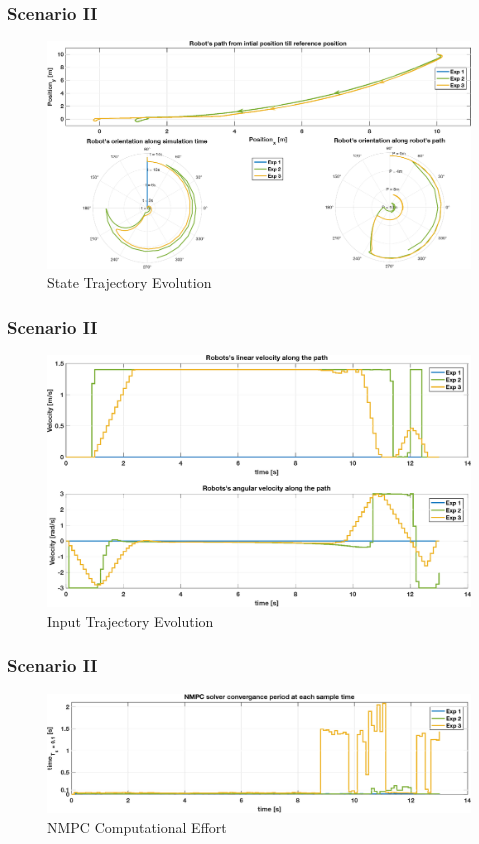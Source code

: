  	\begin{frame}
 		\frametitle{Scenario II}
 		\begin{figure}[hbtp]
 			\centering
 			\includegraphics[scale=0.44]{pictures/graphs/sn1_states_2.eps}
 			\caption{State Trajectory Evolution}
 		\end{figure}
 	\end{frame}
 	
 	\begin{frame}
 		\frametitle{Scenario II}
 		\begin{figure}[hbtp]
 			\centering
 			\includegraphics[scale=0.42]{pictures/graphs/sn1_inputs_2.eps}
 			\caption{Input Trajectory Evolution}
 		\end{figure}
 	\end{frame}
 	
 	\begin{frame}
 		\frametitle{Scenario II}
 		\begin{figure}[hbtp]
 			\centering
 			\includegraphics[scale=0.42]{pictures/graphs/sn1_solver_time_2.eps}
 			\caption{NMPC Computational Effort}
 		\end{figure}
 	\end{frame}
 	
